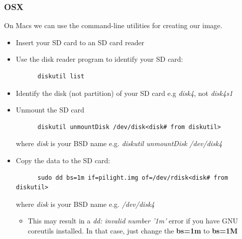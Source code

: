 \subsubsection{OSX}
On Macs we can use the command-line utilities for creating our image.
\begin{itemize}
   \item Insert your SD card to an SD card reader
   \item Use the disk reader program to identify your SD card:
      \begin{lstlisting}
      diskutil list
      \end{lstlisting}
   \item Identify the disk (not partition) of your SD card e.g \textit{disk4}, not \textit{disk4s1}
   \item Unmount the SD card
      \begin{lstlisting}
      diskutil unmountDisk /dev/disk<disk# from diskutil>
      \end{lstlisting}
      where \textit{disk} is your BSD name e.g. \textit{diskutil unmountDisk /dev/disk4}
   \item Copy the data to the SD card:
      \begin{lstlisting}
      sudo dd bs=1m if=pilight.img of=/dev/rdisk<disk# from diskutil>
      \end{lstlisting}
      where \textit{disk} is your BSD name e.g. \textit{/dev/disk4}
      \begin{itemize}
         \item This may result in a \textit{dd: invalid number '1m'} error if you have GNU coreutils installed. In that case, just change the \textbf{bs=1m} to \textbf{bs=1M}
      \end{itemize}
\end{itemize}
